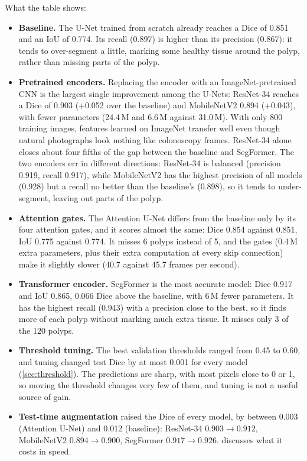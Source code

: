 What the table shows:
\begin{itemize}
  \item \textbf{Baseline.} The U-Net trained from scratch already reaches a Dice of 0.851 and an IoU of 0.774. Its recall
        (0.897) is higher than its precision (0.867): it tends to over-segment a little, marking some healthy tissue
        around the polyp, rather than missing parts of the polyp.
  \item \textbf{Pretrained encoders.} Replacing the encoder with an ImageNet-pretrained CNN is the largest single
        improvement among the U-Nets: ResNet-34 reaches a Dice of 0.903 (+0.052 over the baseline) and MobileNetV2
        0.894 (+0.043), with fewer parameters (24.4\,M and 6.6\,M against 31.0\,M). With only 800 training images,
        features learned on ImageNet transfer well even though natural photographs look nothing like colonoscopy
        frames. ResNet-34 alone closes about four fifths of the gap between the baseline and SegFormer. The two
        encoders err in different directions: ResNet-34 is balanced (precision 0.919, recall 0.917), while MobileNetV2
        has the highest precision of all models (0.928) but a recall no better than the baseline's (0.898), so it
        tends to under-segment, leaving out parts of the polyp.
  \item \textbf{Attention gates.} The Attention U-Net differs from the baseline only by its four attention gates, and it
        scores almost the same: Dice 0.854 against 0.851, IoU 0.775 against 0.774. It misses 6 polyps instead of 5,
        and the gates (0.4\,M extra parameters, plus their extra computation at every skip connection) make it
        slightly slower (40.7 against 45.7 frames per second).
  \item \textbf{Transformer encoder.} SegFormer is the most accurate model: Dice 0.917 and IoU 0.865, 0.066 Dice above the
        baseline, with 6\,M fewer parameters. It has the highest recall (0.943) with a precision close to the best, so
        it finds more of each polyp without marking much extra tissue. It misses only 3 of the 120 polyps.
  \item \textbf{Threshold tuning.} The best validation thresholds ranged from 0.45 to 0.60, and tuning changed test Dice
        by at most 0.001 for every model (\cref{sec:threshold}). The predictions are sharp, with most pixels close to 0 or 1, so
        moving the threshold changes very few of them, and tuning is not a useful source of gain.
  \item \textbf{Test-time augmentation} raised the Dice of every model, by between 0.003 (Attention U-Net) and 0.012
        (baseline): ResNet-34 $0.903 \rightarrow 0.912$, MobileNetV2 $0.894 \rightarrow 0.900$, SegFormer $0.917 \rightarrow 0.926$.  discusses
        what it costs in speed.
\end{itemize}

